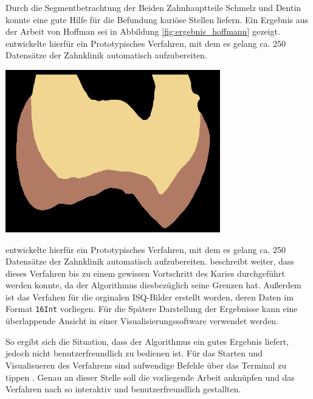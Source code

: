 \begin{minipage}{0.30\textwidth}
	Durch die Segmentbetrachtung der Beiden Zahnhauptteile Schmelz und Dentin konnte
	\citet{hoffmann2020} eine gute Hilfe für die Befundung kariöse Stellen liefern.
	Ein Ergebnis aus der Arbeit von Hoffman sei in Abbildung \ref{fig:ergebnis_hoffmann}
	gezeigt. \citet{hoffmann2020} entwickelte hierfür ein Prototypisches Verfahren,
	mit dem es gelang ca. 250 Datensätze der Zahnklinik automatisch aufzubereiten.
\end{minipage}
\hfill
\begin{minipage}{0.60\textwidth}
	\centering
	\includegraphics[width=0.7\textwidth]{img/ergebnis_hoffmann_2.jpg}
	\label{fig:ergebnis_hoffmann}
\end{minipage}

\citet{hoffmann2020} entwickelte hierfür ein Prototypisches Verfahren, mit dem
es gelang ca. 250 Datensätze der Zahnklinik automatisch aufzubereiten. \citet{hoffmann2020}
beschreibt weiter, dass dieses Verfahren bis zu einem gewissen Vortschritt des
Karies durchgeführt werden konnte, da der Algorithmus diesbezüglich seine Grenzen
hat. Außerdem ist das Verfahen für die orginalen ISQ-Bilder erstellt worden, deren
Daten im Format \texttt{16Int} vorliegen. Für die Spätere Darstellung der Ergebnisse
kann eine überlappende Ansicht in einer Visualisierungssoftware verwendet werden.

So ergibt sich die Situation, dass der Algorithmus ein gutes Ergebnis liefert, jedoch
nicht benutzerfreundlich zu bedienen ist. Für das Starten und Visualisueren des
Verfahrens sind aufwendige Befehle über das Terminal zu tippen \citep[vgl.][Seite
53]{hoffmann2020}. Genau an dieser Stelle soll die vorliegende Arbeit anknüpfen und
das Verfahren nach \citet{hoffmann2020} so interaktiv und benutzerfreundlich
gestallten.

